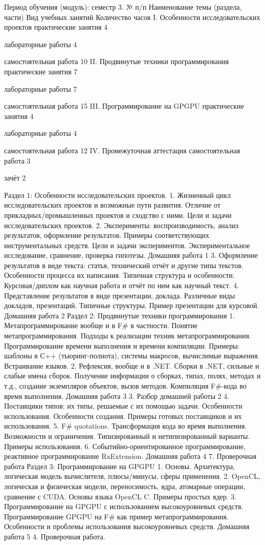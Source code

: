 Период обучения (модуль): семестр 3.
№ п/п
Наименование темы (раздела, части)
Вид учебных занятий
Количество часов
I.
Особенности исследовательских проектов
практические занятия
4


лабораторные работы
4


самостоятельная работа
10
II.
Продвинутые техники программирования
практические занятия
7


лабораторные работы
7


самостоятельная работа
15
III.
Программирование на GPGPU
практические занятия
4


лабораторные работы
4


самостоятельная работа
12
IV.
Промежуточная аттестация
самостоятельная работа
3


зачёт
2

Раздел 1: Особенности исследовательских проектов.
    1. Жизненный цикл исследовательских проектов и возможные пути развития. Отличие от прикладных/промышленных проектов и сходство с ними. Цели и задачи исследовательских проектов. 
    2. Эксперименты: воспроизводимость, анализ результатов, оформление результатов. Примеры соответствующих инструментальных средств. Цели и задачи экспериментов. Экспериментальное исследование, сравнение, проверка гипотезы.
Домашняя работа 1
    3. Оформление результатов в виде текста: статья, технический отчёт и другие типы текстов. Особенности процесса их написания. Типичная структура и особенности. Курсовая/диплом как научная работа и отчёт по ним как научный текст.
    4. Представление результатов в виде презентации, доклада. Различные виды докладов, презентаций. Типичные структуры. Пример презентации для курсовой.
Домашняя работа 2
Раздел 2: Продвинутые техники программирования 
    1. Метапрограммирование вообще и в F# в частности. Понятие метапрограммирования. Подходы к реализации техник метапрограммирования.  Программирование времени выполнения и времени компиляции. Примеры: шаблоны в С++ (тьюринг-полнота), системы макросов, вычислимые выражения. Встраивание языков.
    2. Рефлексия, вообще и в .NET. Сборки в .NET, сильные и слабые имена сборок. Получение информации о сборках, типах, полях, методах и т.д., создание экземпляров объектов, вызов методов. Компиляция F#-кода во время выполнения.
Домашняя работа 3
    3. Разбор домашней работы 2   
    4. Поставщики типов: их типы, решаемые с их помощью задачи. Особенности использования. Особенности создания. Примеры готовых поставщиков и их использования.
    5. F# quotations. Трансформация кода во время выполнения. Возможности и ограничения. Типизированный и нетипизированный варианты. Примеры использования.
    6. Событийно-ориентированное программирование, реактивное программирование RxExtension.
Домашняя работа 4
    7. Проверочная работа
Раздел 3: Программирование на GPGPU
    1. Основы. Архитектура, логическая модель вычислителя, плюсы/минусы, сферы применения.
    2. OpenCL, логическая и физическая модели, переносимость, ядра, атомарные операции, сравнение с CUDA. Основы языка OpenCL C. Примеры простых ядер.
    3. Программирование на GPGPU с использованием высокоуровневых средств. Программирование GPGPU на F# как пример метапрограммирования. Особенности и проблемы использования высокоуровневых средств.
Домашняя работа 5
    4. Проверочная работа.
